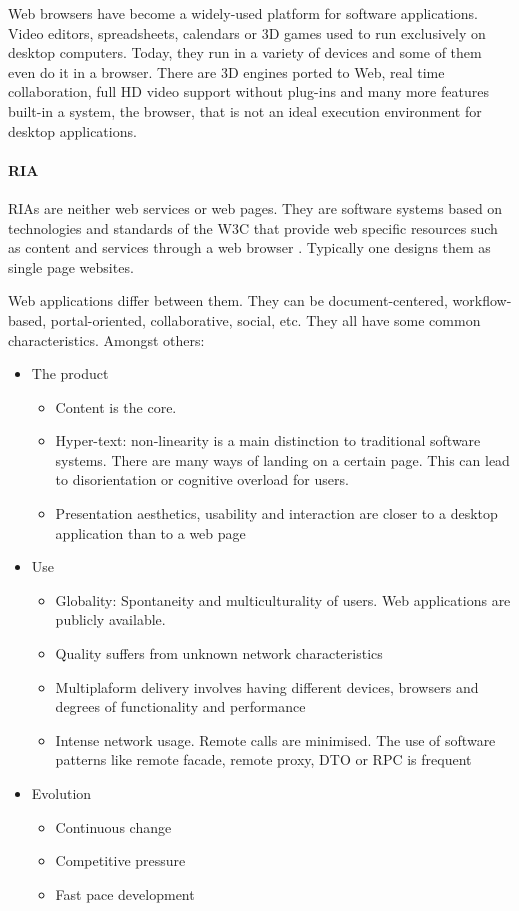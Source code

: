 Web browsers have become a widely-used platform for software applications. 
Video editors, spreadsheets, calendars or 3D games used to run exclusively on desktop computers. 
Today, they run in a variety of devices and some of them even do it in a browser. 
There are 3D engines ported to Web, real time collaboration, full HD video support without plug-ins and many more features built-in a system, the browser, that is not an ideal execution environment for desktop applications.

\paragraph{\ac{RIA}}
\acp{RIA} are neither web services or web pages. 
They are software systems based on technologies and standards of the \ac{W3C} that provide web specific resources such as content and services through a web browser \cite{Kappel:2006}.
Typically one designs them as single page websites.

Web applications differ between them. 
They can be document-centered, workflow-based, portal-oriented, collaborative, social, etc. 
They all have some common characteristics. Amongst others:
\begin{itemize}
    \item The product
    \begin{itemize}
        \item Content is the core.
        \item Hyper-text: non-linearity is a main distinction to traditional software systems. There are many ways of landing on a certain page. This can lead to disorientation or cognitive overload for users.
        \item Presentation aesthetics, usability and interaction are closer to a desktop application than to a web page
    \end{itemize}
    \item Use
    \begin{itemize}
        \item Globality: Spontaneity and multiculturality of users. Web applications are publicly available.
        \item Quality suffers from unknown network characteristics
        \item Multiplaform delivery involves having different devices, browsers and degrees of functionality and performance
        \item Intense network usage. Remote calls are minimised. The use of software patterns like remote facade, remote proxy, \ac{DTO} or \ac{RPC} is frequent
    \end{itemize}
    \item Evolution
    \begin{itemize}
         \item Continuous change
         \item Competitive pressure
         \item Fast pace development
    \end{itemize}   
\end{itemize}

